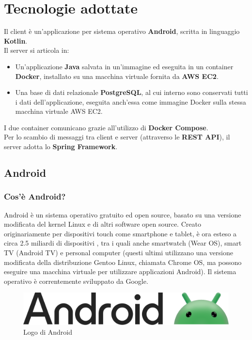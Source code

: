     \section{Tecnologie adottate}
        Il client è un'applicazione per sistema operativo \textbf{Android}, scritta in linguaggio \textbf{Kotlin}. \\
        Il server si articola in:
        \begin{itemize}
            \item Un'applicazione \textbf{Java} salvata in un'immagine ed eseguita in un container \textbf{Docker}, installato su una macchina virtuale fornita da \textbf{AWS EC2}.
            \item Una base di dati relazionale \textbf{PostgreSQL}, al cui interno sono conservati tutti i dati dell'applicazione, eseguita anch'essa come immagine Docker sulla stessa macchina virtuale AWS EC2.
        \end{itemize}
        I due container comunicano grazie all'utilizzo di \textbf{Docker Compose}. \\
        Per lo scambio di messaggi tra client e server (attraverso le \textbf{REST API}), il server adotta lo \textbf{Spring Framework}. \\

        \subsection{Android}
            \subsubsection{Cos'è Android? \cite{Wikipedia1}}
                Android è un sistema operativo gratuito ed open source, basato su una versione modificata del kernel Linux e di altri software open source. Creato originariamente per dispositivi touch come smartphone e tablet, è ora esteso a circa 2.5 miliardi di dispositivi \cite{Google1}, tra i quali anche smartwatch (Wear OS), smart TV (Android TV) e personal computer (questi ultimi utilizzano una versione modificata della distribuzione Gentoo Linux, chiamata Chrome OS, ma possono eseguire una macchina virtuale per utilizzare applicazioni Android). Il sistema operativo è correntemente sviluppato da Google.
            \begin{figure}[htbp!]
                \centering
                \includegraphics[width=0.5\linewidth]{Immagini/System Design/Android.png}
                \caption{Logo di Android}
            \end{figure}
